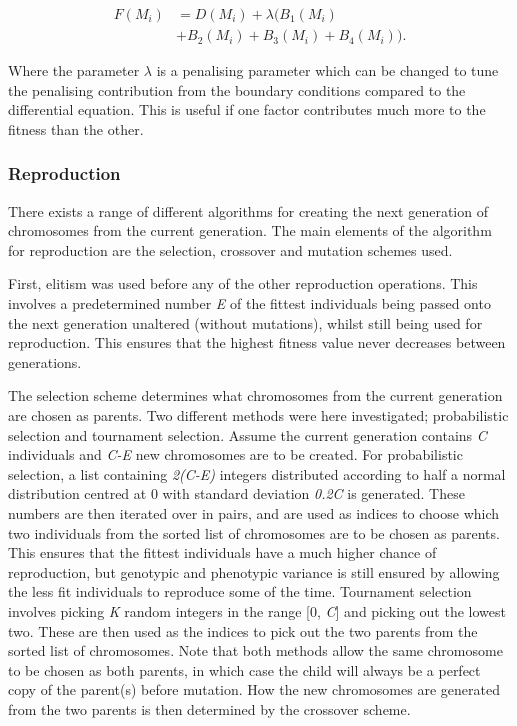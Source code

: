 \documentclass[multicolumn, 9pt]{extarticle}
\begin{document}
\begin{align*}
	F(M_{i}) & = D(M_{i}) + \lambda  ( B_1(M_{i})            \\
	         & +  B_2(M_{i})  +  B_3(M_{i})  + B_4(M_{i})  ).
\end{align*}

Where the parameter $\lambda$ is a penalising parameter which can be changed to tune the penalising contribution from the boundary conditions compared to the differential equation. This is useful if one factor contributes much more to the fitness than the other. 

\subsubsection{Reproduction}
There exists a range of different algorithms for creating the next generation of chromosomes from the current generation. The main elements  of the algorithm for reproduction are the selection, crossover and mutation schemes used.

First, elitism was used before any of the other reproduction operations. This involves a predetermined number  \textit{E} of the fittest individuals being passed onto the next generation unaltered (without mutations), whilst still being used for reproduction. This ensures that the highest fitness value never decreases between generations. 

The selection scheme determines what chromosomes from the current generation are chosen as parents. Two different methods were here investigated; probabilistic selection and tournament selection. Assume the current generation contains \textit{C} individuals and \textit{C-E} new chromosomes are to be created. For probabilistic selection, a list containing \textit{2(C-E)} integers distributed according to half a normal distribution centred at 0 with standard deviation \textit{0.2C} is generated. These numbers are then iterated over in pairs, and are used as indices to choose which two individuals from the sorted list of chromosomes are to be chosen as parents. This ensures that the fittest individuals have a much higher chance of reproduction, but genotypic and phenotypic variance is still ensured by allowing the less fit individuals to reproduce some of the time. Tournament selection involves picking \textit{K} random integers in the range [0, \textit{C}] and picking out the lowest two. These are then used as the indices to pick out the two parents from the sorted list of chromosomes. Note that both methods allow the same chromosome to be chosen as both parents, in which case the child will always be a perfect copy of the parent(s) before mutation. How the new chromosomes are generated from the two parents is then determined by the crossover scheme. 
\end{document}

